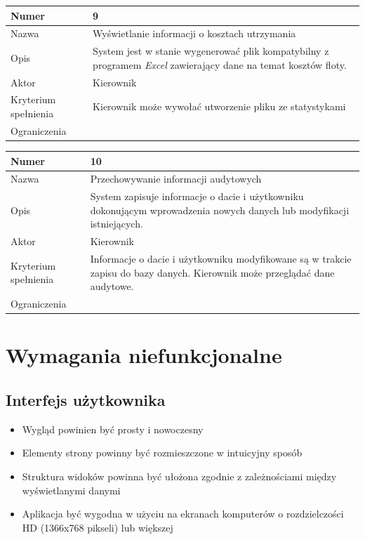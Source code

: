 \documentclass[eng,printmode,openany]{mgr}
\begin{document}
	\begin{table}[H]
		\begin{tabularx}{\textwidth}{|l|X|}
			\hline
			Numer                & 9 \\ \hline
			Nazwa                & Wyświetlanie informacji o kosztach utrzymania \\ \hline
			Opis                 & System jest w stanie wygenerować plik kompatybilny z programem \textit{Excel} zawierający dane na temat kosztów floty. \\ \hline
			Aktor                & Kierownik \\ \hline
			Kryterium spełnienia & Kierownik może wywołać utworzenie pliku ze statystykami  \\ \hline
			Ograniczenia         & \\ \hline
		\end{tabularx}
	\end{table}
	
	\begin{table}[H]
		\begin{tabularx}{\textwidth}{|l|X|}
			\hline
			Numer                & 10 \\ \hline
			Nazwa                & Przechowywanie informacji audytowych \\ \hline
			Opis                 & System zapisuje informacje o dacie i użytkowniku dokonującym wprowadzenia nowych danych lub modyfikacji istniejących. \\ \hline
			Aktor                & Kierownik \\ \hline
			Kryterium spełnienia & Informacje o dacie i użytkowniku modyfikowane są w trakcie zapisu do bazy danych. Kierownik może przeglądać dane audytowe.  \\ \hline
			Ograniczenia         & \\ \hline
		\end{tabularx}
	\end{table}
	
	\section{Wymagania niefunkcjonalne}
	\subsection{Interfejs użytkownika}
	\begin{itemize}
		\item Wygląd powinien być prosty i nowoczesny
		\item Elementy strony powinny być rozmieszczone w intuicyjny sposób
		\item Struktura widoków powinna być ułożona zgodnie z zależnościami między wyświetlanymi danymi
		\item Aplikacja być wygodna w użyciu na ekranach komputerów o rozdzielczości HD (1366x768 pikseli) lub większej
	\end{itemize}
\end{document}
